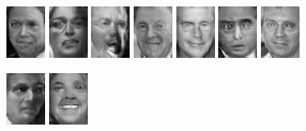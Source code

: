 \begin{figure}[!h]
{        \includegraphics[scale=1]{figures/lfw/appendix2/lfw64x48bw_image0025.png}
        \includegraphics[scale=1]{figures/lfw/appendix2/lfw64x48bw_image0026.png}
        \includegraphics[scale=1]{figures/lfw/appendix2/lfw64x48bw_image0027.png}
        \includegraphics[scale=1]{figures/lfw/appendix2/lfw64x48bw_image0028.png}
        \includegraphics[scale=1]{figures/lfw/appendix2/lfw64x48bw_image0029.png}
        \includegraphics[scale=1]{figures/lfw/appendix2/lfw64x48bw_image0030.png}
        \includegraphics[scale=1]{figures/lfw/appendix2/lfw64x48bw_image0031.png}
    }
    \vspace{0.1cm}
    \centerline{
        \includegraphics[scale=1]{figures/lfw/appendix2/lfw64x48bw_image0032.png}
        \includegraphics[scale=1]{figures/lfw/appendix2/lfw64x48bw_image0033.png}
}
\end{figure}
